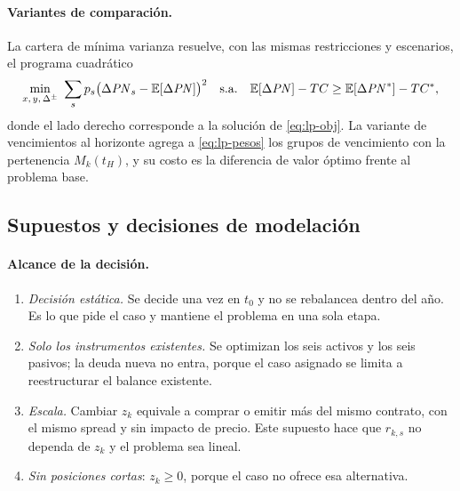 \paragraph{Variantes de comparación.} La cartera de mínima varianza resuelve, con las mismas restricciones y
escenarios, el programa cuadrático
\[
  \min_{x,\,y,\,\Delta^\pm}\ \sum_s p_s\big(\Delta\mathit{PN}_s - \mathbb{E}[\Delta\mathit{PN}]\big)^2
  \quad\text{s.a.}\quad \mathbb{E}[\Delta\mathit{PN}] - TC \ge \mathbb{E}[\Delta\mathit{PN}^*] - TC^*,
\]
donde el lado derecho corresponde a la solución de \eqref{eq:lp-obj}. La variante de vencimientos al horizonte
agrega a \eqref{eq:lp-pesos} los grupos de vencimiento con la pertenencia $M_k(t_H)$, y su costo es la
diferencia de valor óptimo frente al problema base.

\subsection{Supuestos y decisiones de modelación}\label{app:supuestos}
\paragraph{Alcance de la decisión.}
\begin{enumerate}
  \item \emph{Decisión estática.} Se decide una vez en $t_0$ y no se rebalancea dentro del año. Es lo que pide el
  caso y mantiene el problema en una sola etapa.
  \item \emph{Solo los instrumentos existentes.} Se optimizan los seis activos y los seis pasivos; la deuda nueva
  no entra, porque el caso asignado se limita a reestructurar el balance existente.
  \item \emph{Escala.} Cambiar $z_k$ equivale a comprar o emitir más del mismo contrato, con el mismo spread y sin
  impacto de precio. Este supuesto hace que $r_{k,s}$ no dependa de $z_k$ y el problema sea lineal.
  \item \emph{Sin posiciones cortas}: $z_k \ge 0$, porque el caso no ofrece esa alternativa.
\end{enumerate}

